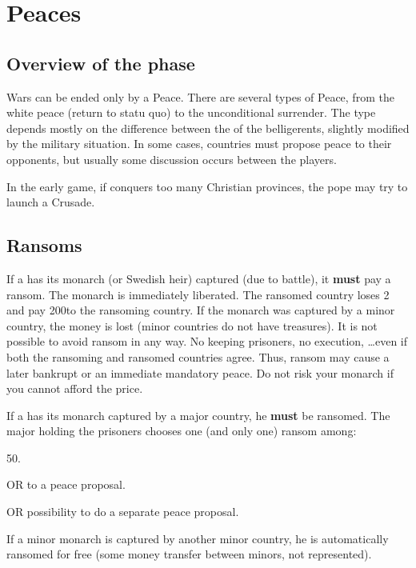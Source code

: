 
\chapter{Peaces}\label{chapter:Peace}

\section{Overview of the phase}

\aparag[Peace] Wars can be ended only by a Peace. There are several types of
Peace, from the white peace (return to statu quo) to the unconditional
surrender. The type depends mostly on the difference between the \STAB of the
belligerents, slightly modified by the military situation. In some cases,
countries must propose peace to their opponents, but usually some discussion
occurs between the players.

\aparag[Crusade] In the early game, if \TUR conquers too many Christian
provinces, the pope may try to launch a Crusade.

\PeaceDetails

\section{Ransoms}\label{chPeace:Ransoms}
\aparag[Majors] If a \MAJ has its monarch (or Swedish heir) captured (due to
battle), it \textbf{must} pay a ransom. The monarch is immediately liberated.
\bparag The ransomed country loses 2 \STAB and pay 200\ducats to the ransoming
country.
\bparag If the monarch was captured by a minor country, the money is lost
(minor countries do not have treasures).
\bparag It is not possible to avoid ransom in any way. No keeping prisoners,
no execution, \ldots even if both the ransoming and ransomed countries agree.
\bparag Thus, ransom may cause a later bankrupt or an immediate mandatory
peace. Do not risk your monarch if you cannot afford the price.

\aparag[Minors] If a \MIN has its monarch captured by a major country, he
\textbf{must} be ransomed.
\bparag The major holding the prisoners chooses one (and only one) ransom
among:
\begin{modlist}
\item 50\ducats.
\item[OR]  to a peace proposal.
\item[OR] possibility to do a separate peace proposal.
\end{modlist}
\bparag If a minor monarch is captured by another minor country, he is
automatically ransomed for free (some money transfer between minors, not
represented).

